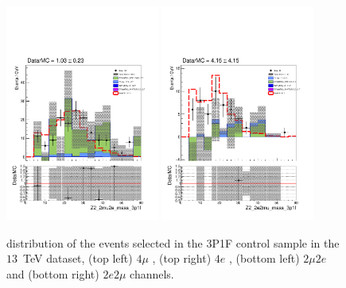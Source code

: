 \begin{figure}[!htb]
\begin{center}
    {\includegraphics [width=0.45\textwidth] {Figures/RedBkg/3P1F_vs_Pred/Z2_2mu2e_mass_3p1f.pdf}}
    {\includegraphics [width=0.45\textwidth] {Figures/RedBkg/3P1F_vs_Pred/Z2_2e2mu_mass_3p1f.pdf}} \\
\caption{
 distribution of the events selected in the 3P1F control sample in the
$13$~TeV dataset, (top left)  $4\mu$ , (top right) $4e$ , (bottom left)  $2\mu2e$ and (bottom right)  $2e2\mu$ channels.
}
\label{fig:3P1F_CR}
\end{center}
\end{figure}

